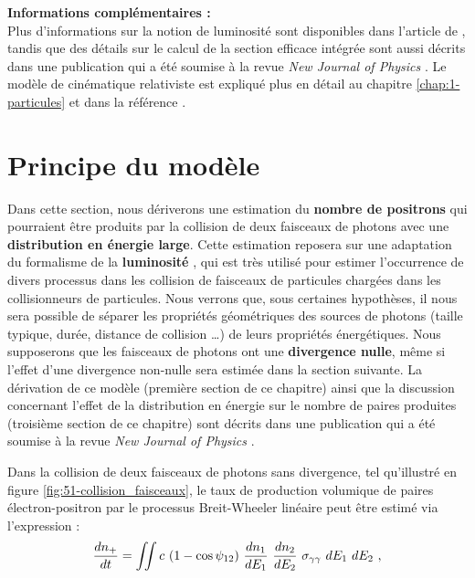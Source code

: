 \begin{refsection}
{\begin{minipage}{\textwidth}
    \medskip
    \textbf{Informations complémentaires :}\\
    Plus d'informations sur la notion de luminosité sont disponibles dans l'article de \cite{herr_2006}, tandis que des détails sur le calcul de la section efficace intégrée sont aussi décrits dans une publication qui a été soumise à la revue \textit{New Journal of Physics} \parencite{esnault_2021}. Le modèle de cinématique relativiste est expliqué plus en détail au chapitre \ref{chap:1-particules} et dans la référence \parencite{ribeyre_2017}.
\end{minipage}}
\newpage

\section{Principe du modèle}

Dans cette section, nous dériverons une estimation du \textbf{nombre de positrons} qui pourraient être produits par la collision de deux faisceaux de photons avec une \textbf{distribution en énergie large}. Cette estimation reposera sur une adaptation du formalisme de la \textbf{luminosité} \parencite{herr_2006}, qui est très utilisé pour estimer l'occurrence de divers processus dans les collision de faisceaux de particules chargées dans les collisionneurs de particules. Nous verrons que, sous certaines hypothèses, il nous sera possible de séparer les propriétés géométriques des sources de photons (taille typique, durée, distance de collision …) de leurs propriétés énergétiques. Nous supposerons que les faisceaux de photons ont une \textbf{divergence nulle}, même si l'effet d'une divergence non-nulle sera estimée dans la section suivante. La dérivation de ce modèle (première section de ce chapitre) ainsi que la discussion concernant l'effet de la distribution en énergie sur le nombre de paires produites (troisième section de ce chapitre) sont décrits dans une publication qui a été soumise à la revue \textit{New Journal of Physics} \parencite{esnault_2021}.

Dans la collision de deux faisceaux de photons sans divergence, tel qu'illustré en figure \ref{fig:51-collision_faisceaux}, le taux de production volumique de paires électron-positron par le processus Breit-Wheeler linéaire peut être estimé via l'expression \parencite{gould_1971, landau_1975} :
\begin{equation}
    \dfrac{d n_+}{dt} = \iint c ~ (1-\cos{\psi_{12}}) ~ \dfrac{d n_1}{d E_1} ~ \dfrac{d n_2}{d E_2} ~ \sigma_{\gamma\gamma} ~ d E_1 ~ d E_2 ~ \rm ,
    \label{eq:51-taux_positrons}
\end{equation}


\end{refsection}
